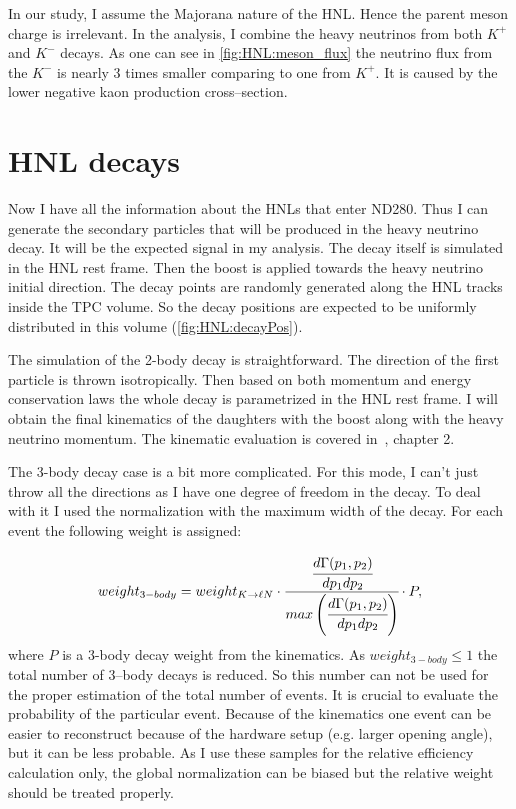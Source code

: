 \documentclass[../main.tex]{subfiles}
\begin{document}
In our study, I assume the Majorana nature of the HNL. Hence the parent meson charge is irrelevant. In the analysis, I combine the heavy neutrinos from both $K^+$ and $K^-$ decays. As one can see in \autoref{fig:HNL:meson_flux} the neutrino flux from the $K^-$ is nearly 3 times smaller comparing to one from $K^+$. It is caused by the lower negative kaon production cross--section.

\section{HNL decays}
Now I have all the information about the HNLs that enter ND280. Thus I can generate the secondary particles that will be produced in the heavy neutrino decay. It will be the expected signal in my analysis. The decay itself is simulated in the HNL rest frame. Then the boost is applied towards the heavy neutrino initial direction. The decay points are randomly generated along the  HNL tracks inside the TPC volume. So the decay positions are expected to be uniformly distributed in this volume (\autoref{fig:HNL:decayPos}).

The simulation of the 2-body decay is straightforward. The direction of the first particle is thrown isotropically. Then based on both momentum and energy conservation laws the whole decay is parametrized in the HNL rest frame. I will obtain the final kinematics of the daughters with the boost along with the heavy neutrino momentum. The kinematic evaluation is covered in~\cite{Landau2013}, chapter 2.

The 3-body decay case is a bit more complicated. For this mode, I can't just throw all the directions as I have one degree of freedom in the decay. To deal with it I used the normalization with the maximum width of the decay. For each event the following weight is assigned:

\begin{equation}
    weight_{3-body}=weight_{K\rightarrow \ell N}\cdot\cfrac{\cfrac{d\Gamma(p_1,p_2)}{dp_1dp_2}}{max\left(\cfrac{d\Gamma(p_1,p_2)}{dp_1dp_2}\right)}\cdot P,
\end{equation}
where $P$ is a 3-body decay weight from the kinematics. As $weight_{3-body} \le 1$ the total number of 3--body decays is reduced. So this number can not be used for the proper estimation of the total number of events. It is crucial to evaluate the probability of the particular event. Because of the kinematics one event can be easier to reconstruct because of the hardware setup (e.g. larger opening angle), but it can be less probable. As I use these samples for the relative efficiency calculation only, the global normalization can be biased but the relative weight should be treated properly.
\end{document}
